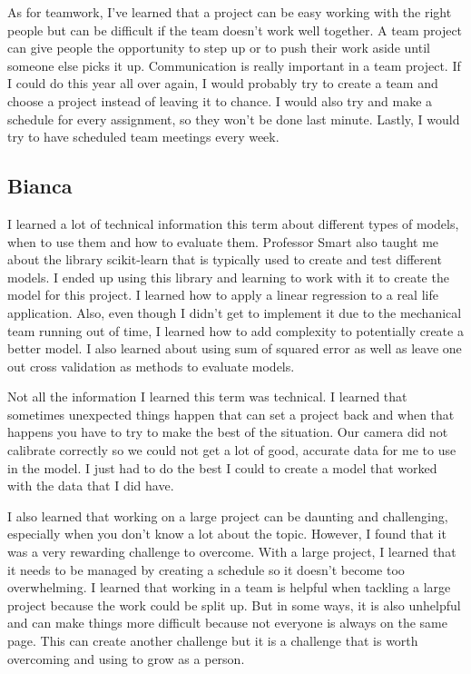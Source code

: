 \documentclass[onecolumn, draftclsnofoot,10pt, compsoc]{IEEEtran}
\begin{document}
	As for teamwork, I've learned that a project can be easy working with the right people but can be difficult if the team doesn't work well together.  A team project can give people the opportunity to step up or to push their work aside until someone else picks it up. Communication is really important in a team project. If I could do this year all over again, I would probably try to create a team and choose a project instead of leaving it to chance. I would also try and make a schedule for every assignment, so they won't be done last minute. Lastly, I would try to have scheduled team meetings every week.
	
	
	\subsection{Bianca}
	
I learned a lot of technical information this term about different types of models, when to use them and how to evaluate them. Professor Smart also taught me about the library scikit-learn that is typically used to create and test different models. I ended up using this library and learning to work with it to create the model for this project. I learned how to apply a linear regression to a real life application. Also, even though I didn't get to implement it due to the mechanical team running out of time, I learned how to add complexity to potentially create a better model. I also learned about using sum of squared error as well as leave one out cross validation as methods to evaluate models. 

Not all the information I learned this term was technical. I learned that sometimes unexpected things happen that can set a project back and when that happens you have to try to make the best of the situation. Our camera did not calibrate correctly so we could not get a lot of good, accurate data for me to use in the model. I just had to do the best I could to create a model that worked with the data that I did have.

I also learned that working on a large project can be daunting and challenging, especially when you don't know a lot about the topic. However, I found that it was a very rewarding challenge to overcome. With a large project, I learned that it needs to be managed by creating a schedule so it doesn't become too overwhelming. I learned that working in a team is helpful when tackling a large project because the work could be split up. But in some ways, it is also unhelpful and can make things more difficult because not everyone is always on the same page. This can create another challenge but it is a challenge that is worth overcoming and using to grow as a person. 
\end{document}
